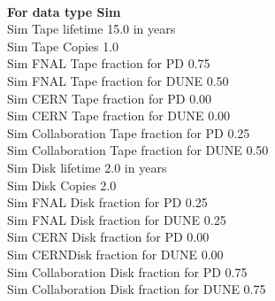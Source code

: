 \documentclass[12pt]{article}
\begin{document}
\\
{\bf For data type Sim}\\
   Sim Tape lifetime  15.0 in years\\
   Sim Tape Copies   1.0\\
   Sim FNAL Tape fraction for PD  0.75\\
   Sim FNAL Tape fraction for DUNE  0.50\\
   Sim CERN Tape fraction for PD  0.00\\
   Sim CERN Tape fraction for DUNE  0.00\\
   Sim Collaboration Tape fraction for PD  0.25\\
   Sim Collaboration Tape fraction for DUNE  0.50\\
   Sim Disk lifetime   2.0 in years\\
   Sim Disk Copies   2.0\\
   Sim FNAL Disk fraction for PD  0.25\\
   Sim FNAL Disk fraction for DUNE  0.25\\
   Sim CERN Disk fraction for PD  0.00\\
   Sim CERNDisk fraction for DUNE  0.00\\
   Sim Collaboration Disk fraction for PD  0.75\\
   Sim Collaboration Disk fraction for DUNE  0.75\\
\pagebreak\\
\end{document}
